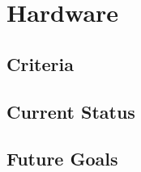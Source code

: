 \section{Hardware}\label{SEC:hardware}

\subsection{Criteria}
\subsection{Current Status}
\subsection{Future Goals}